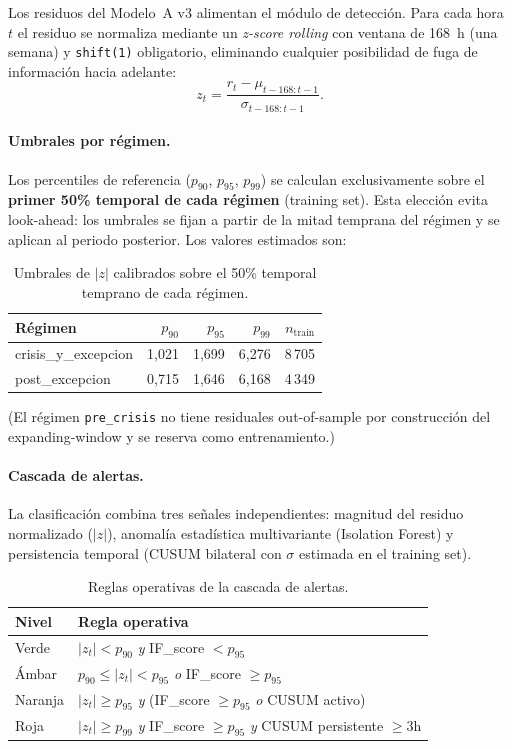 \documentclass[11pt,a4paper]{article}
\begin{document}
Los residuos del Modelo~A v3 alimentan el módulo de detección. Para
cada hora $t$ el residuo se normaliza mediante un \emph{z-score rolling}
con ventana de 168~h (una semana) y \texttt{shift(1)} obligatorio,
eliminando cualquier posibilidad de fuga de información hacia adelante:
\[
z_t = \frac{r_t - \mu_{t-168 : t-1}}{\sigma_{t-168 : t-1}}.
\]

\paragraph{Umbrales por régimen.} Los percentiles de referencia
($p_{90}$, $p_{95}$, $p_{99}$) se calculan exclusivamente sobre el
\textbf{primer 50\% temporal de cada régimen} (training set). Esta
elección evita look-ahead: los umbrales se fijan a partir de la mitad
temprana del régimen y se aplican al periodo posterior. Los valores
estimados son:

\begin{table}[H]
\centering
\small
\caption{Umbrales de $|z|$ calibrados sobre el 50\% temporal temprano de cada régimen.}
\label{tab:thresholds}
\begin{tabular}{lrrrr}
\toprule
\textbf{Régimen} & \textbf{$p_{90}$} & \textbf{$p_{95}$} & \textbf{$p_{99}$} & \textbf{$n_\text{train}$} \\
\midrule
crisis\_y\_excepcion & 1{,}021 & 1{,}699 & 6{,}276 & 8\,705 \\
post\_excepcion      & 0{,}715 & 1{,}646 & 6{,}168 & 4\,349 \\
\bottomrule
\end{tabular}
\end{table}

(El régimen \texttt{pre\_crisis} no tiene residuales out-of-sample por
construcción del expanding-window y se reserva como entrenamiento.)

\paragraph{Cascada de alertas.} La clasificación combina tres señales
independientes: magnitud del residuo normalizado ($|z|$), anomalía
estadística multivariante (Isolation Forest) y persistencia temporal
(CUSUM bilateral con $\sigma$ estimada en el training set).

\begin{table}[H]
\centering
\small
\caption{Reglas operativas de la cascada de alertas.}
\label{tab:cascade}
\begin{tabular}{ll}
\toprule
\textbf{Nivel} & \textbf{Regla operativa} \\
\midrule
Verde   & $|z_t| < p_{90}$ \emph{y} IF\_score $< p_{95}$ \\
Ámbar   & $p_{90} \leq |z_t| < p_{95}$ \emph{o} IF\_score $\geq p_{95}$ \\
Naranja & $|z_t| \geq p_{95}$ \emph{y} (IF\_score $\geq p_{95}$ \emph{o} CUSUM activo) \\
Roja    & $|z_t| \geq p_{99}$ \emph{y} IF\_score $\geq p_{95}$ \emph{y} CUSUM persistente $\geq 3$h \\
\bottomrule
\end{tabular}
\end{table}
\end{document}
